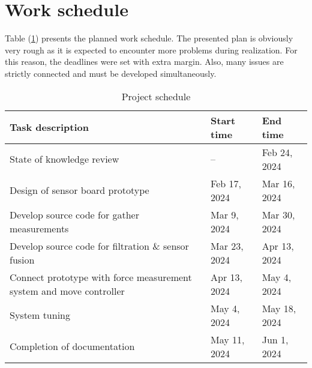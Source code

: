 \section{Work schedule}

Table (\ref{work_schedule}) presents the planned work schedule. The presented plan is obviously very rough as it is expected to encounter more problems during realization. For this reason, the deadlines were set with extra margin. Also, many issues are strictly connected and must be developed simultaneously.

\renewcommand{\arraystretch}{1.5}
\begin{table}[!h]
\centering
\begin{tabular}{|m{}|m{}|m{}|} 
\hline
\rowcolor{Gray}
Task description & Start time & End time  \\
\hline
State of knowledge review & -- & Feb 24, 2024 \\
\hline
Design of sensor board prototype & Feb 17, 2024 & Mar 16, 2024 \\
\hline
Develop source code for gather measurements & Mar 9, 2024 & Mar 30, 2024 \\
\hline
Develop source code for filtration \& sensor fusion & Mar 23, 2024 & Apr 13, 2024 \\
\hline
Connect prototype with force measurement system and move controller & Apr 13, 2024 & May 4, 2024 \\
\hline
System tuning & May 4, 2024 & May 18, 2024 \\
\hline
Completion of documentation  & May 11, 2024 & Jun 1, 2024 \\
\hline
\end{tabular}
\caption{Project schedule}
\label{work_schedule}
\end{table}

